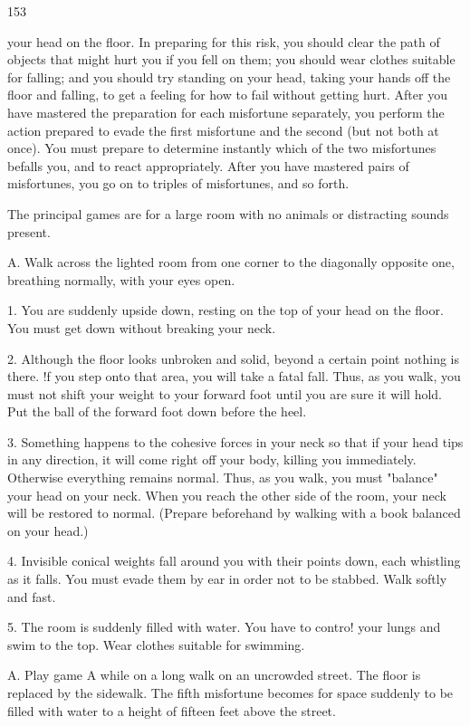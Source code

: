 \documentclass[10pt,twoside]{memoir}
\begin{document}
\begin{enumerate}
{\begin{enumerate}
\begin{sysrules}
\begin{sysrules}
\begin{sysrules}
\begin{sysrules}
153 


your head on the floor. In preparing for this risk, you should clear the path 
of objects that might hurt you if you fell on them; you should wear clothes 
suitable for falling; and you should try standing on your head, taking your 
hands off the floor and falling, to get a feeling for how to fail without 
getting hurt. After you have mastered the preparation for each misfortune 
separately, you perform the action prepared to evade the first misfortune 
and the second (but not both at once). You must prepare to determine 
instantly which of the two misfortunes befalls you, and to react 
appropriately. After you have mastered pairs of misfortunes, you go on to 
triples of misfortunes, and so forth. 

The principal games are for a large room with no animals or distracting 
sounds present. 

A. Walk across the lighted room from one corner to the diagonally 
opposite one, breathing normally, with your eyes open. 

1. You are suddenly upside down, resting on the top of your head on the 
floor. You must get down without breaking your neck. 

2. Although the floor looks unbroken and solid, beyond a certain point 
nothing is there. !f you step onto that area, you will take a fatal fall. Thus, as 
you walk, you must not shift your weight to your forward foot until you are 
sure it will hold. Put the ball of the forward foot down before the heel. 

3. Something happens to the cohesive forces in your neck so that if your 
head tips in any direction, it will come right off your body, killing you 
immediately. Otherwise everything remains normal. Thus, as you walk, you 
must "balance" your head on your neck. When you reach the other side of 
the room, your neck will be restored to normal. (Prepare beforehand by 
walking with a book balanced on your head.) 

4. Invisible conical weights fall around you with their points down, each 
whistling as it falls. You must evade them by ear in order not to be stabbed. 
Walk softly and fast. 

5. The room is suddenly filled with water. You have to contro! your lungs 
and swim to the top. Wear clothes suitable for swimming. 

A. Play game A while on a long walk on an uncrowded street. The floor 
is replaced by the sidewalk. The fifth misfortune becomes for space suddenly 
to be filled with water to a height of fifteen feet above the street. 


\end{sysrules}
\end{sysrules}
\end{sysrules}
\end{sysrules}
\end{enumerate}}
\end{enumerate}
\end{document}
